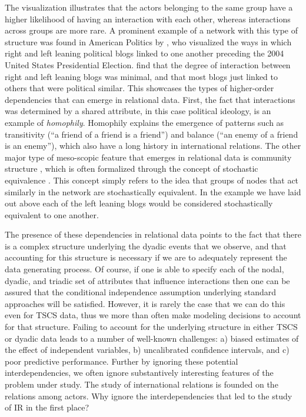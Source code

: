 The visualization illustrates that the actors belonging to the same group have a higher likelihood of having an interaction with each other, whereas interactions across groups are more rare. A prominent example of a network with this type of structure was found in American Politics by \citet{adamic:glance:2005}, who visualized the ways in which right and left leaning political blogs linked to one another preceding the 2004 United States Presidential Election. \citeauthor{adamic:glance:2005} find that the degree of interaction between right and left leaning blogs was minimal, and that most blogs just linked to others that were political similar. This showcases the types of higher-order dependencies that can emerge in relational data. First, the fact that interactions was determined by a shared attribute, in this case political ideology, is an example of \textit{homophily}. Homophily explains the emergence of patterns such as transitivity (``a friend of a friend is a friend'') and balance (``an enemy of a friend is an enemy''), which also have a long history in international relations. The other major type of meso-scopic feature that emerges in relational data is community structure \citep{mucha:etal:2010}, which is often formalized through the concept of stochastic equivalence \citep{anderson:etal:1992}. This concept simply refers to the idea that groups of nodes that act similarly in the network are stochastically equivalent. In the example we have laid out above each of the left leaning blogs would be considered stochastically equivalent to one another. 

The presence of these dependencies in relational data points to the fact that there is a complex structure underlying the dyadic events that we observe, and that accounting for this structure is necessary if we are to adequately represent the data generating process. Of course, if one is able to specify each of the nodal, dyadic, and triadic set of attributes that influence interactions then one can be assured that the conditional independence assumption underlying standard approaches will be satisfied. However, it is rarely the case that we can do this even for TSCS data, thus we more than often make modeling decisions to account for that structure. Failing to account for the underlying structure in either TSCS or dyadic data leads to a number of well-known challenges: a) biased estimates of the effect of independent variables, b) uncalibrated confidence intervals, and c) poor predictive performance. Further by ignoring these potential interdependencies, we often ignore substantively interesting features of the problem under study. The study of international relations is founded on the relations among actors. Why ignore the interdependencies that led to the study of IR in the first place?

